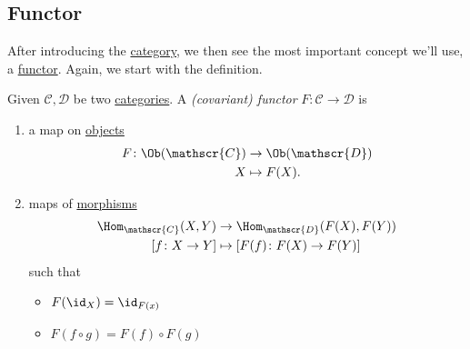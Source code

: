 \subsection{Functor}
After introducing the \hyperref[def:category]{category}, we then see the most important concept we'll use, a \hyperref[def:functor]{functor}.
Again, we start with the definition.
\begin{definition}[Functor]\label{def:functor}
	Given \(\mathscr{C} , \mathscr{D} \) be two \hyperref[def:category]{categories}. A \emph{(covariant) functor} \(F\colon \mathscr{C} \to \mathscr{D}\)
	is
	\begin{enumerate}[(1)]
		\item a map on \hyperref[def:object]{objects}
		      \[
			      \begin{split}
				      F\colon \Ob(\mathscr{C} ) & \to \Ob(\mathscr{D} ) \\
				      X                         & \mapsto F(X).
			      \end{split}
		      \]
		\item maps of \hyperref[def:morphism]{morphisms}
		      \[
			      \begin{split}
				      \Hom_{\mathscr{C} }(X, Y)   & \to \Hom_{\mathscr{D} }(F(X), F(Y))          \\
				      \left[f\colon X\to Y\right] & \mapsto \left[F(f)\colon F(X)\to F(Y)\right]
			      \end{split}
		      \]
		      such that
		      \begin{itemize}
			      \item \(F(\id_{X} ) = \id_{F(x)} \)
			      \item \(F(f\circ g) = F(f)\circ F(g)\)
		      \end{itemize}
	\end{enumerate}
\end{definition}
